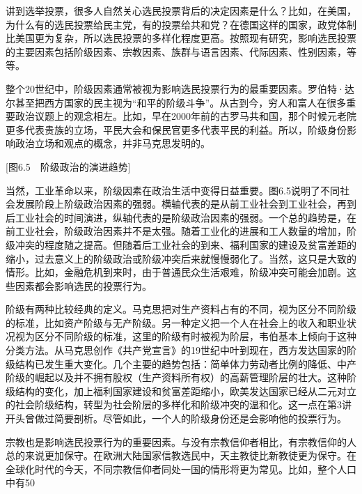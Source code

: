 讲到选举投票，很多人自然关心选民投票背后的决定因素是什么？比如，在美国，为什么有的选民投票给民主党，有的投票给共和党？在德国这样的国家，政党体制比美国更为复杂，所以选民投票的多样化程度更高。按照现有研究，影响选民投票的主要因素包括阶级因素、宗教因素、族群与语言因素、代际因素、性别因素，等等。

整个20世纪中，阶级因素通常被视为影响选民投票行为的最重要因素。罗伯特·达尔甚至把西方国家的民主视为“和平的阶级斗争”。从古到今，穷人和富人在很多重要政治议题上的观念相左。比如，早在2000年前的古罗马共和国，那个时候元老院更多代表贵族的立场，平民大会和保民官更多代表平民的利益。所以，阶级身份影响政治立场和观点的概念，并非马克思发明的。

[图6.5　阶级政治的演进趋势]

当然，工业革命以来，阶级因素在政治生活中变得日益重要。图6.5说明了不同社会发展阶段上阶级政治因素的强弱。横轴代表的是从前工业社会到工业社会，再到后工业社会的时间演进，纵轴代表的是阶级政治因素的强弱。一个总的趋势是，在前工业社会，阶级政治因素并不是太强。随着工业化的进展和工人数量的增加，阶级冲突的程度随之提高。但随着后工业社会的到来、福利国家的建设及贫富差距的缩小，过去意义上的阶级政治或阶级冲突后来就慢慢弱化了。当然，这只是大致的情形。比如，金融危机到来时，由于普通民众生活艰难，阶级冲突可能会加剧。这些因素都会影响选民的投票行为。

阶级有两种比较经典的定义。马克思把对生产资料占有的不同，视为区分不同阶级的标准，比如资产阶级与无产阶级。另一种定义把一个人在社会上的收入和职业状况视为区分不同阶级的标准，这里的阶级有时被视为阶层，韦伯基本上倾向于这种分类方法。从马克思创作《共产党宣言》的19世纪中叶到现在，西方发达国家的阶级结构已发生重大变化。几个主要的趋势包括：简单体力劳动者比例的降低、中产阶级的崛起以及并不拥有股权（生产资料所有权）的高薪管理阶层的壮大。这种阶级结构的变化，加上福利国家建设和贫富差距缩小，欧美发达国家已经从二元对立的社会阶级结构，转型为社会阶层的多样化和阶级冲突的温和化。这一点在第3讲开头曾做过简要剖析。尽管如此，一个人的阶级身份还是会影响他的投票行为。

宗教也是影响选民投票行为的重要因素。与没有宗教信仰者相比，有宗教信仰的人总的来说更加保守。在欧洲大陆国家信教选民中，天主教徒比新教徒更为保守。在全球化时代的今天，不同宗教信仰者同处一国的情形将更为常见。比如，整个人口中有50%


